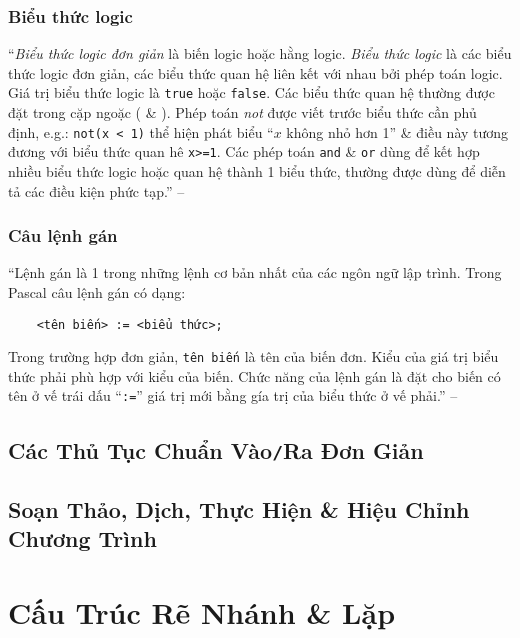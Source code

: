\documentclass[oneside]{book}
\numberwithin{equation}{section}
\begin{document}
\subsection{Biểu thức logic}
``\textit{Biểu thức logic đơn giản} là biến logic hoặc hằng logic. \textit{Biểu thức logic} là các biểu thức logic đơn giản, các biểu thức quan hệ liên kết với nhau bởi phép toán logic. Giá trị biểu thức logic là \texttt{true} hoặc \texttt{false}. Các biểu thức quan hệ thường được đặt trong cặp ngoặc ( \& ). Phép toán \textit{not} được viết trước biểu thức cần phủ định, e.g.: \verb|not(x < 1)| thể hiện phát biểu ``$x$ không nhỏ hơn 1'' \& điều này tương đương với biểu thức quan hê \verb|x>=1|. Các phép toán \texttt{and} \& \texttt{or} dùng để kết hợp nhiều biểu thức logic hoặc quan hệ thành 1 biểu thức, thường được dùng để diễn tả các điều kiện phức tạp.'' -- \cite[p. 28]{SGK_Tin_Hoc_11}

\subsection{Câu lệnh gán}
``Lệnh gán là 1 trong những lệnh cơ bản nhất của các ngôn ngữ lập trình. Trong Pascal câu lệnh gán có dạng:
\begin{verbatim}
	<tên biến> := <biểu thức>;
\end{verbatim}
Trong trường hợp đơn giản, \texttt{tên biến} là tên của biến đơn. Kiểu của giá trị biểu thức phải phù hợp với kiểu của biến. Chức năng của lệnh gán là đặt cho biến có tên ở vế trái dấu ``\texttt{:=}'' giá trị mới bằng gía trị của biểu thức ở vế phải.'' -- \cite[p. 28]{SGK_Tin_Hoc_11}


\section{Các Thủ Tục Chuẩn Vào\texttt{/}Ra Đơn Giản}


\section{Soạn Thảo, Dịch, Thực Hiện \& Hiệu Chỉnh Chương Trình}


\chapter{Cấu Trúc Rẽ Nhánh \& Lặp}
\end{document}
